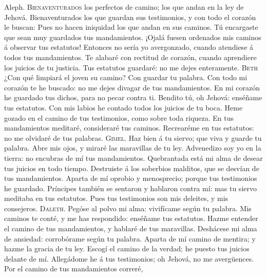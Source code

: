  Aleph. \textsc{Bienaventurados} los perfectos de camino;
los que andan en la ley de Jehová.  Bienaventurados los
que guardan sus testimonios, y con todo el corazón le buscan:
 Pues no hacen iniquidad los que andan en sus caminos.
 Tú encargaste que sean muy guardados tus mandamientos.
 ¡Ojalá fuesen ordenados mis caminos á observar tus
estatutos!  Entonces no sería yo avergonzado, cuando
atendiese á todos tus mandamientos.  Te alabaré con
rectitud de corazón, cuando aprendiere los juicios de tu justicia.
 Tus estatutos guardaré: no me dejes enteramente.
 \textsc{Beth} ¿Con qué limpiará el joven su camino? Con
guardar tu palabra.  Con todo mi corazón te he buscado:
no me dejes divagar de tus mandamientos.  En mi corazón
he guardado tus dichos, para no pecar contra ti.  Bendito
tú, oh Jehová: enséñame tus estatutos.  Con mis labios he
contado todos los juicios de tu boca.  Heme gozado en el
camino de tus testimonios, como sobre toda riqueza.  En
tus mandamientos meditaré, consideraré tus caminos. 
Recrearéme en tus estatutos: no me olvidaré de tus palabras.
 \textsc{Gimel}. Haz bien á tu siervo; que viva y guarde
tu palabra.  Abre mis ojos, y miraré las maravillas de tu
ley.  Advenedizo soy yo en la tierra: no encubras de mí
tus mandamientos.  Quebrantada está mi alma de desear tus
juicios en todo tiempo.  Destruiste á los soberbios
malditos, que se desvían de tus mandamientos.  Aparta de
mí oprobio y menosprecio; porque tus testimonios he guardado.
 Príncipes también se sentaron y hablaron contra mí: mas
tu siervo meditaba en tus estatutos.  Pues tus
testimonios son mis deleites, y mis consejeros. 
\textsc{Daleth}. Pegóse al polvo mi alma: vivifícame según tu palabra.
 Mis caminos te conté, y me has respondido: enséñame tus
estatutos.  Hazme entender el camino de tus mandamientos,
y hablaré de tus maravillas.  Deshácese mi alma de
ansiedad: corrobórame según tu palabra.  Aparta de mí
camino de mentira; y hazme la gracia de tu ley.  Escogí
el camino de la verdad; he puesto tus juicios delante de mí.
 Allegádome he á tus testimonios; oh Jehová, no me
avergüences.  Por el camino de tus mandamientos correré,

